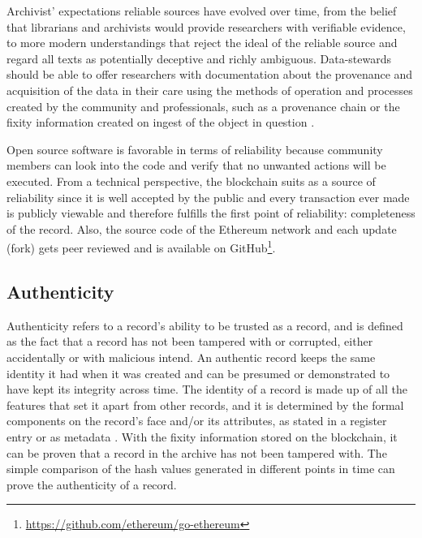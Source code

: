\documentclass[final]{vutinfth}
\begin{document}
Archivist' expectations reliable sources have evolved over time, from the belief that librarians and archivists would provide researchers with verifiable evidence, to more modern understandings that reject the ideal of the reliable source and regard all texts as potentially deceptive and richly ambiguous. Data-stewards should be able to offer researchers with documentation about the provenance and acquisition of the data in their care using the methods of operation and processes created by the community and professionals, such as a provenance chain or the fixity information created on ingest of the object in question \cite[32]{kirschenbaum2010digital}.

Open source software is favorable in terms of reliability because community members can look into the code and verify that no unwanted actions will be executed. From a technical perspective, the blockchain suits as a source of reliability since it is well accepted by the public and every transaction ever made is publicly viewable and therefore fulfills the first point of reliability: completeness of the record. Also, the source code of the Ethereum network and each update (fork) gets peer reviewed and is available on GitHub\footnote{\url{https://github.com/ethereum/go-ethereum}}.


\subsection{Authenticity}
Authenticity refers to a record's ability to be trusted as a record, and is defined as the fact that a record has not been tampered with or corrupted, either accidentally or with malicious intend. An authentic record keeps the same identity it had when it was created and can be presumed or demonstrated to have kept its integrity across time. The identity of a record is made up of all the features that set it apart from other records, and it is determined by the formal components on the record's face and/or its attributes, as stated in a register entry or as metadata \cite[52]{duranti2009digital}.
With the fixity information stored on the blockchain, it can be proven that a record in the archive has not been tampered with. The simple comparison of the hash values generated in different points in time can prove the authenticity of a record.
\end{document}
